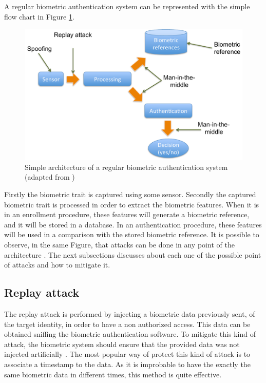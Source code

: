 A regular biometric authentication system can be represented with the simple flow chart in Figure \ref{fig:diagram_attacks}.
\begin{figure}[!htb]
\begin{center}
\includegraphics [width=14cm] {images/diagram_attacks.pdf}
\caption[]{Simple architecture of a regular biometric authentication system (adapted from \cite{xiao2005security})} \label{fig:diagram_attacks}
\end{center}
\end{figure}

Firstly the biometric trait is captured using some sensor. Secondly the captured biometric trait is processed in order to extract the biometric features. When it is in an enrollment procedure, these features will generate a biometric reference, and it will be stored in a database. In an authentication procedure, these features will be used in a comparison with the stored biometric reference. It is possible to observe, in the same Figure, that attacks can be done in any point of the architecture \cite{xiao2005security}. The next subsections discusses about each one of the possible point of attacks and how to mitigate it.

\label{sec:AttacksBiometric}

\subsection{Replay attack}
\label{sec:rep}

The replay attack is performed by injecting a biometric data previously sent, of the target identity, in order to have a non authorized access. This data can be obtained sniffing the biometric authentication software. To mitigate this kind of attack, the biometric system should ensure that the provided data was not injected artificially \cite{xiao2005security}. The most  popular way of protect this kind of attack is to associate a timestamp to the data. As it is improbable to have the exactly the same biometric data in different times, this method is quite effective.

